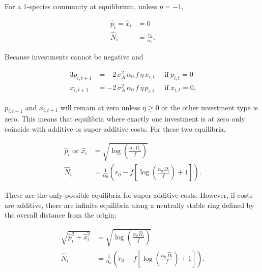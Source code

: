 For a 1-species community at equilibrium, unless \(\eta = - 1\),

\begin{equation}
\label{eq:analytical-1spp-solns}
\begin{split}
    \hat{p}_{i} = \hat{x}_{i} &= 0 \\
    \hat{N}_i &= \frac{r_0}{\alpha_0}
    \text{.}
\end{split}
\end{equation}



Because investments cannot be negative and

\begin{alignat*}{3}
    p_{i,t + 1} &= - 2 \, \sigma_{A}^{2} \, \alpha_{0} \, f \, \eta \, x_{i,t} & \;\; 
        \text{if} ~ p_{i,t} = 0 \\
    x_{i,t + 1} &= - 2 \, \sigma_{A}^{2} \, \alpha_{0} \, f \, \eta \, p_{i,t} & \;\; 
        \text{if} ~ x_{i,t} = 0
\text{,}
\end{alignat*}


\(p_{i,t + 1}\) and \(x_{i,t + 1}\) will remain at zero unless
\(\eta \geq 0\) or the other investment type is zero. This means that
equilibria where exactly one investment is at zero only coincide with
additive or super-additive costs. For these two equilibria,


\begin{equation}
\label{eq:analytical-super-solns}
\begin{split}
    \hat{p}_i \textrm{ or } \hat{x}_i &= \sqrt{\log \left( 
            \frac{\alpha_0 \, \hat{\Omega}_i}{f} 
        \right)} \\
    \hat{N}_i &= \frac{1}{\alpha_0} \left(
        r_0 - f \left[
            \log\left( \frac{\alpha_0 \, \hat{\Omega}_i }{f}
            \right) + 1 
        \right]
    \right)
    \text{.}
\end{split}
\end{equation}




These are the only possible equilibria for super-additive costs.
However, if costs are additive, there are infinite equilibria along a
neutrally stable ring defined by the overall distance from the origin:

    
\begin{equation}
\label{eq:analytical-additive-solns}
\begin{split}
    \sqrt{\hat{p}_{i}^{2} + \hat{x}_{i}^{2}} &= \sqrt{\log\left(
        \frac{\alpha_{0} \, \hat{\Omega}_{i}}{f} \right)} \\
    \hat{N}_{i} &= \frac{1}{\alpha_{0}} \left( 
        r_{0} - f \left[ \log\left(  
        \frac{\alpha_{0} \, \hat{\Omega}_{i}}{f} \right) + 1 \right]
    \right)\text{.} \\
\end{split}
\end{equation}



